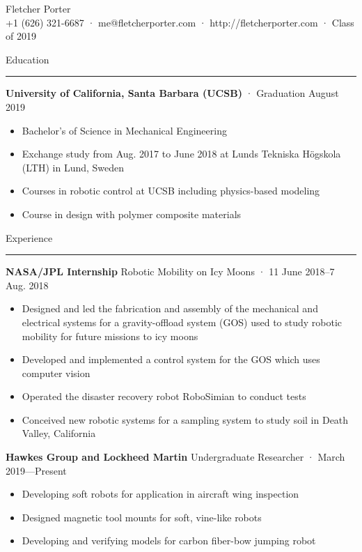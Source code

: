\documentclass[12pt, oneside]{article}
\newcommand{\titlestyle}[1] {
	{\fontsize{50pt}{1em}\selectfont \textcolor{new_red}{\textsf{#1}}} \\
}
\newcommand{\headingstyleJobs}[1] {
	{\fontsize{19pt}{1em}\selectfont \textcolor{new_red}{\textsf{#1}}}
	\textcolor{new_red}{\rule{3.25in}{0.5pt}} \vspace{3pt}
}
\newcommand{\infostyle}[1] {
	{\fontsize{9pt}{1em}\selectfont #1} \\ \vspace{10pt}
}
\newcommand{\jobtitle}[3] {
	{\bf #1} {#2} · {#3} \vspace{-10pt} \\
}
\begin{document}
\begin{flushleft}



\titlestyle{Fletcher Porter}
\infostyle{+1 (626) 321-6687 · me@fletcherporter.com · http://fletcherporter.com · Class of 2019}


\headingstyleJobs{Education}

\jobtitle{University of California, Santa Barbara (UCSB)}{}{Graduation August 2019}
\begin{itemize}
	\item Bachelor's of Science in Mechanical Engineering
	\item Exchange study from Aug. 2017 to June 2018 at Lunds Tekniska Högskola (LTH) in Lund, Sweden
	\item Courses in robotic control at UCSB including physics-based modeling
	\item Course in design with polymer composite materials
\end{itemize}


\headingstyleJobs{Experience}

\jobtitle{NASA/JPL Internship}{Robotic Mobility on Icy Moons}{11 June 2018–7 Aug. 2018}
\begin{itemize}
	\item Designed and led the fabrication and assembly of the mechanical and electrical systems for a gravity-offload system (GOS)  used to study robotic mobility for future missions to icy moons
	\item Developed and implemented a control system for the GOS which uses computer vision
	\item Operated the disaster recovery robot RoboSimian to conduct tests
	\item Conceived new robotic systems for a sampling system to study soil in Death Valley, California
\end{itemize}

\jobtitle{Hawkes Group and Lockheed Martin}{Undergraduate Researcher}{March 2019—Present}
\begin{itemize}
	\item Developing soft robots for application in aircraft wing inspection
	\item Designed magnetic tool mounts for soft, vine-like robots
	\item Developing and verifying models for carbon fiber-bow jumping robot
\end{itemize}


\end{flushleft}
\end{document}
